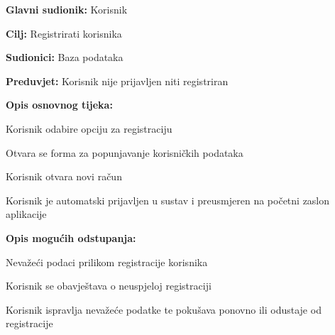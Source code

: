 \noindent {}
\begin{packed_item}

	\item \textbf{Glavni sudionik:} Korisnik
	\item \textbf{Cilj:} Registrirati korisnika
	\item \textbf{Sudionici:} Baza podataka
	\item \textbf{Preduvjet:} Korisnik nije prijavljen niti registriran
	\item \textbf{Opis osnovnog tijeka:}
	
	\item[] \begin{packed_enum}
		
		\item Korisnik odabire opciju za registraciju
		\item Otvara se forma za popunjavanje korisničkih podataka
		\item Korisnik otvara novi račun 
		\item Korisnik je automatski prijavljen u sustav i preusmjeren na početni zaslon aplikacije

	\end{packed_enum}

	\item  \textbf{Opis mogućih odstupanja:}
	
	\item[] \begin{packed_item}
	
		\item[2.a] Nevažeći podaci prilikom registracije korisnika
		\item[] \begin{packed_enum}
			
			\item Korisnik se obavještava o neuspjeloj registraciji
			\item Korisnik ispravlja nevažeće podatke te pokušava ponovno ili odustaje od registracije
			
		\end{packed_enum}
		
	\end{packed_item}
\end{packed_item}

\pagebreak

